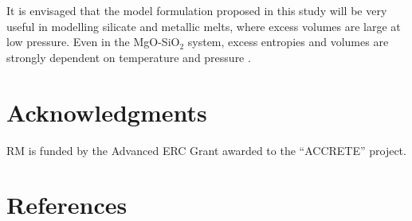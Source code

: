 \documentclass[review]{elsarticle}
\begin{document}
It is envisaged that the model formulation proposed in this study will be very useful in modelling silicate and metallic melts, where excess volumes are large at low pressure. Even in the MgO-SiO$_2$ system, excess entropies and volumes are strongly dependent on temperature and pressure \citep{DKS2013}.


\section{Acknowledgments}
RM is funded by the Advanced ERC Grant awarded to the ``ACCRETE'' project.
\clearpage
\section*{References}


\end{document}
